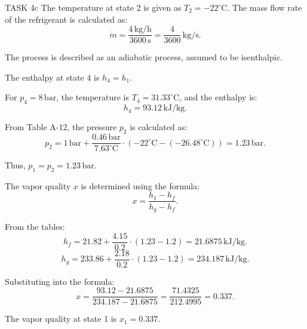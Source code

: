 TASK 4c  
The temperature at state 2 is given as \( T_2 = -22^\circ\text{C} \). The mass flow rate of the refrigerant is calculated as:  
\[
\dot{m} = \frac{4 \, \text{kg/h}}{3600 \, \text{s}} = \frac{4}{3600} \, \text{kg/s}.
\]

The process is described as an adiabatic process, assumed to be isenthalpic.  

The enthalpy at state 4 is \( h_4 = h_1 \).  

For \( p_4 = 8 \, \text{bar} \), the temperature is \( T_4 = 31.33^\circ\text{C} \), and the enthalpy is:  
\[
h_4 = 93.12 \, \text{kJ/kg}.
\]

From Table A-12, the pressure \( p_2 \) is calculated as:  
\[
p_2 = 1 \, \text{bar} + \frac{0.46 \, \text{bar}}{7.63^\circ\text{C}} \cdot (-22^\circ\text{C} - (-26.48^\circ\text{C})) = 1.23 \, \text{bar}.
\]

Thus, \( p_1 = p_2 = 1.23 \, \text{bar} \).  

The vapor quality \( x \) is determined using the formula:  
\[
x = \frac{h_1 - h_f}{h_g - h_f}.
\]

From the tables:  
\[
h_f = 21.82 + \frac{4.15}{0.2} \cdot (1.23 - 1.2) = 21.6875 \, \text{kJ/kg}.
\]  
\[
h_g = 233.86 + \frac{2.18}{0.2} \cdot (1.23 - 1.2) = 234.187 \, \text{kJ/kg}.
\]

Substituting into the formula:  
\[
x = \frac{93.12 - 21.6875}{234.187 - 21.6875} = \frac{71.4325}{212.4995} = 0.337.
\]  

The vapor quality at state 1 is \( x_1 = 0.337 \).